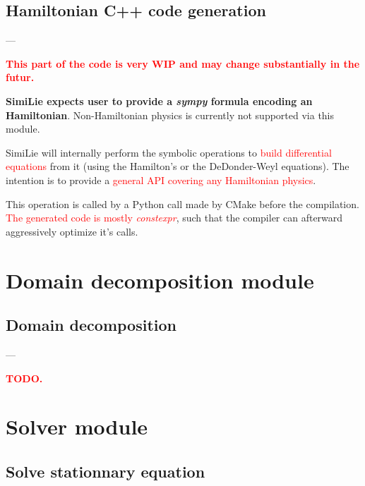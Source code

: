 \documentclass[9pt, svgnames, aspectratio=32, handout]{beamer}
\newenvironment{tframe}[1][]{%
  \begin{frame}[fragile,environment=tframe]{%
    \normalsize{{\bfseries \secname} --- \small{\subsecname} #1}%
  }%
}{%
  \end{frame}%
}
\begin{document}
\subsection{Hamiltonian C++ code generation}

\begin{tframe}
\begin{center}
\textbf{\textcolor{red}{This part of the code is very WIP and may change substantially in the futur.}}
\end{center}

\textbf{SimiLie expects user to provide a \textit{sympy} formula encoding an Hamiltonian}. Non-Hamiltonian physics is currently not supported via this module.

SimiLie will internally perform the symbolic operations to \textcolor{red}{build differential equations} from it (using the Hamilton's or the DeDonder-Weyl equations). The intention is to provide a \textcolor{red}{general API covering any Hamiltonian physics}.

This operation is called by a Python call made by CMake before the compilation. \textcolor{red}{The generated code is mostly \textit{constexpr}}, such that the compiler can afterward aggressively optimize it's calls.

\end{tframe}

\section{Domain decomposition module}

\subsection{Domain decomposition}

\begin{tframe}
\begin{center}
\textbf{\textcolor{red}{TODO.}}
\end{center}
\end{tframe}

\section{Solver module}

\subsection{Solve stationnary equation}
\end{document}
